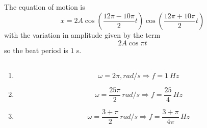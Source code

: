 \documentclass{article}
\begin{document}
\subsection{}

The equation of motion is \[x = 2 A \cos \left( \frac{12 \pi - 10 \pi}{2} t \right) \cos \left( \frac{12 \pi + 10 \pi}{2} t \right)\] with the variation in amplitude given by the term \[2 A \cos \pi t\] so the beat period is $\qty{1}{s}$.

\subsection{}

\begin{enumerate}
  \item \[\omega = 2 \pi, \unit{rad/s} \Rightarrow f = \qty{1}{Hz}\]

  \item \[\omega = \frac{25 \pi}{2} \,\unit{rad/s} \Rightarrow f = \frac{25}{4} \,\unit{Hz}\]

  \item \[\omega = \frac{3 + \pi}{2} \,\unit{rad/s} \Rightarrow f = \frac{3 + \pi}{4 \pi} \,\unit{Hz}\]
\end{enumerate}
\end{document}
